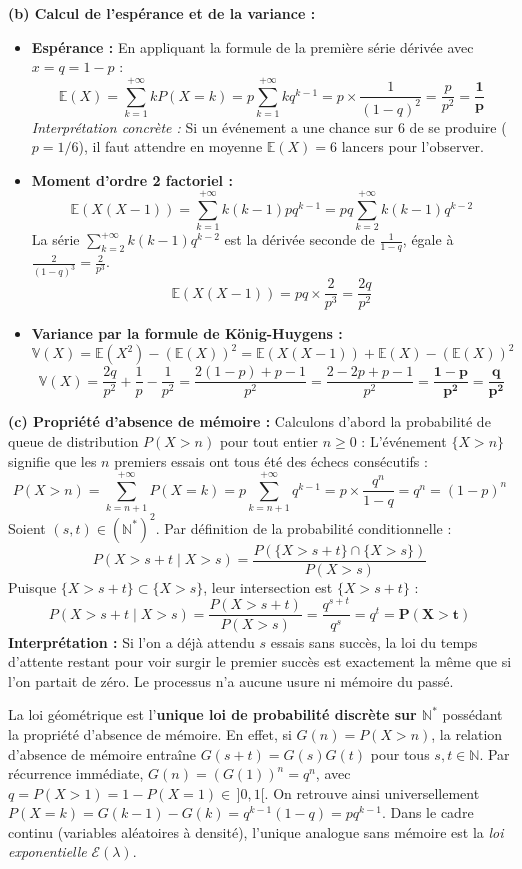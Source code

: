 \documentclass[11pt,a4paper]{article}
\newcommand{\N}{\mathbb{N}}
\newcommand{\E}{\mathbb{E}}
\newcommand{\V}{\mathbb{V}}
\begin{document}
\begin{correctionbox}
\textbf{(b) Calcul de l'espérance et de la variance :}
\begin{itemize}[label=$\bullet$]
    \item \textbf{Espérance :}
    En appliquant la formule de la première série dérivée avec $x = q = 1 - p$ :
    \[
    \E(X) = \sum_{k=1}^{+\infty} k P(X = k) = p \sum_{k=1}^{+\infty} k q^{k-1} = p \times \frac{1}{(1 - q)^2} = \frac{p}{p^2} = \mathbf{\frac{1}{p}}
    \]
    \emph{Interprétation concrète :} Si un événement a une chance sur 6 de se produire ($p = 1/6$), il faut attendre en moyenne $\E(X) = 6$ lancers pour l'observer.
    \item \textbf{Moment d'ordre 2 factoriel :}
    \[
    \E(X(X-1)) = \sum_{k=1}^{+\infty} k(k-1) p q^{k-1} = p q \sum_{k=2}^{+\infty} k(k-1) q^{k-2}
    \]
    La série $\sum_{k=2}^{+\infty} k(k-1) q^{k-2}$ est la dérivée seconde de $\frac{1}{1-q}$, égale à $\frac{2}{(1-q)^3} = \frac{2}{p^3}$.
    \[
    \E(X(X-1)) = p q \times \frac{2}{p^3} = \frac{2q}{p^2}
    \]
    \item \textbf{Variance par la formule de König-Huygens :}
    \[
    \V(X) = \E(X^2) - (\E(X))^2 = \E(X(X-1)) + \E(X) - (\E(X))^2
    \]
    \[
    \V(X) = \frac{2q}{p^2} + \frac{1}{p} - \frac{1}{p^2} = \frac{2(1-p) + p - 1}{p^2} = \frac{2 - 2p + p - 1}{p^2} = \mathbf{\frac{1 - p}{p^2} = \frac{q}{p^2}}
    \]
\end{itemize}

\textbf{(c) Propriété d'absence de mémoire :}
Calculons d'abord la probabilité de queue de distribution $P(X > n)$ pour tout entier $n \ge 0$ :
L'événement $\{X > n\}$ signifie que les $n$ premiers essais ont tous été des échecs consécutifs :
\[
P(X > n) = \sum_{k=n+1}^{+\infty} P(X = k) = p \sum_{k=n+1}^{+\infty} q^{k-1} = p \times \frac{q^n}{1 - q} = q^n = (1 - p)^n
\]
Soient $(s, t) \in (\N^*)^2$. Par définition de la probabilité conditionnelle :
\[
P(X > s + t \mid X > s) = \frac{P(\{X > s + t\} \cap \{X > s\})}{P(X > s)}
\]
Puisque $\{X > s + t\} \subset \{X > s\}$, leur intersection est $\{X > s + t\}$ :
\[
P(X > s + t \mid X > s) = \frac{P(X > s + t)}{P(X > s)} = \frac{q^{s+t}}{q^s} = q^t = \mathbf{P(X > t)}
\]
\textbf{Interprétation :} Si l'on a déjà attendu $s$ essais sans succès, la loi du temps d'attente restant pour voir surgir le premier succès est exactement la même que si l'on partait de zéro. Le processus n'a aucune usure ni mémoire du passé.
\end{correctionbox}

\begin{remarquebox}
La loi géométrique est l'\textbf{unique loi de probabilité discrète sur $\N^*$} possédant la propriété d'absence de mémoire.
En effet, si $G(n) = P(X > n)$, la relation d'absence de mémoire entraîne $G(s+t) = G(s) G(t)$ pour tous $s, t \in \N$.
Par récurrence immédiate, $G(n) = (G(1))^n = q^n$, avec $q = P(X > 1) = 1 - P(X = 1) \in \,]0, 1[$.
On retrouve ainsi universellement $P(X = k) = G(k-1) - G(k) = q^{k-1}(1 - q) = p q^{k-1}$.
Dans le cadre continu (variables aléatoires à densité), l'unique analogue sans mémoire est la \emph{loi exponentielle} $\mathcal{E}(\lambda)$.
\end{remarquebox}
\end{document}
